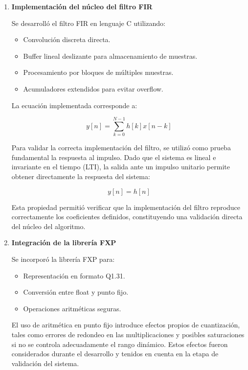 \documentclass[a4,11pt]{article}
\begin{document}
\begin{enumerate}
\item \textbf{Implementación del núcleo del filtro FIR}

Se desarrolló el filtro FIR en lenguaje C utilizando:
\begin{itemize}
\item Convolución discreta directa.
\item Buffer lineal deslizante para almacenamiento de muestras.
\item Procesamiento por bloques de múltiples muestras.
\item Acumuladores extendidos para evitar overflow.
\end{itemize}

La ecuación implementada corresponde a:

\begin{equation}
y[n] = \sum_{k=0}^{N-1} h[k]x[n-k]
\end{equation}

\par Para validar la correcta implementación del filtro, se utilizó como prueba fundamental la respuesta al impulso. Dado que el sistema es lineal e invariante en el tiempo (LTI), la salida ante un impulso unitario permite obtener directamente la respuesta del sistema:

\begin{equation}
y[n] = h[n]
\end{equation}

\par Esta propiedad permitió verificar que la implementación del filtro reproduce correctamente los coeficientes definidos, constituyendo una validación directa del núcleo del algoritmo.

\item \textbf{Integración de la librería FXP}

Se incorporó la librería FXP para:
\begin{itemize}
\item Representación en formato Q1.31.
\item Conversión entre float y punto fijo.
\item Operaciones aritméticas seguras.
\end{itemize}

\par El uso de aritmética en punto fijo introduce efectos propios de cuantización, tales como errores de redondeo en las multiplicaciones y posibles saturaciones si no se controla adecuadamente el rango dinámico. Estos efectos fueron considerados durante el desarrollo y tenidos en cuenta en la etapa de validación del sistema.


\end{enumerate}
\end{document}
